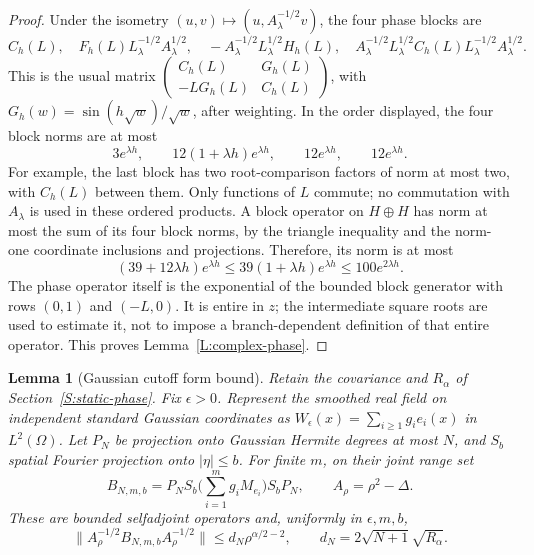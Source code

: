 \documentclass[12pt]{article}
\numberwithin{equation}{section}
\newtheorem{lemma}[theorem]{Lemma}
\theoremstyle{definition}
\begin{document}
\begin{proof}
  Under the isometry $(u,v)\mapsto(u,A_\lambda^{-1/2}v)$,
  the four phase blocks are
  \[
    C_h(L),\quad
    F_h(L)L_\lambda^{-1/2}A_\lambda^{1/2},\quad
    -A_\lambda^{-1/2}L_\lambda^{1/2}H_h(L),\quad
    A_\lambda^{-1/2}L_\lambda^{1/2}C_h(L)
    L_\lambda^{-1/2}A_\lambda^{1/2}.
  \]
  This is the usual matrix
  $\left(\begin{smallmatrix}C_h(L)&G_h(L)\\-LG_h(L)&C_h(L)\end{smallmatrix}\right)$,
  with $G_h(w)=\sin(h\sqrt w)/\sqrt w$, after weighting.
  In the order displayed, the four block norms are at most
  \[
    3e^{\lambda h},\qquad
    12(1+\lambda h)e^{\lambda h},\qquad
    12e^{\lambda h},\qquad12e^{\lambda h}.
  \]
  For example, the last block has two root-comparison factors of norm
  at most two, with $C_h(L)$ between them. Only functions of $L$ commute;
  no commutation with $A_\lambda$ is used in these ordered products.
  A block operator on $H\oplus H$ has norm at most the sum of its four
  block norms, by the triangle inequality and the norm-one coordinate
  inclusions and projections. Therefore, its norm is at most
  \[
    (39+12\lambda h)e^{\lambda h}
    \le39(1+\lambda h)e^{\lambda h}\le100e^{2\lambda h}.
  \]
  The phase operator itself is the exponential of the bounded block
  generator with rows $(0,1)$ and $(-L,0)$. It is entire in $z$;
  the intermediate square roots are used to estimate it, not to impose
  a branch-dependent definition of that entire operator.
  This proves Lemma~\ref{L:complex-phase}.
\end{proof}

\begin{lemma}[Gaussian cutoff form bound]\label{L:fock-form}
  Retain the covariance and $R_\alpha$ of
  Section~\ref{S:static-phase}. Fix $\epsilon>0$.
  Represent the smoothed real field on independent standard Gaussian
  coordinates as $W_\epsilon(x)=\sum_{i\ge1}g_i e_i(x)$ in $L^2(\Omega)$.
  Let $P_N$ be projection onto Gaussian Hermite degrees at most $N$,
  and $S_b$ spatial Fourier projection onto $|\eta|\le b$.
  For finite $m$, on their joint range set
  \[
    B_{N,m,b}=P_NS_b\Big(\sum_{i=1}^m g_i M_{e_i}\Big)S_bP_N,\qquad
    A_\rho=\rho^2-\Delta .
  \]
  These are bounded selfadjoint operators and, uniformly in
  $\epsilon,m,b$,
  \begin{equation}\label{E:fock-sandwich}
    \|A_\rho^{-1/2}B_{N,m,b}A_\rho^{-1/2}\|
    \le d_N\rho^{\alpha/2-2},\qquad
    d_N=2\sqrt{N+1}\sqrt{R_\alpha}.
  \end{equation}
\end{lemma}
\end{document}
